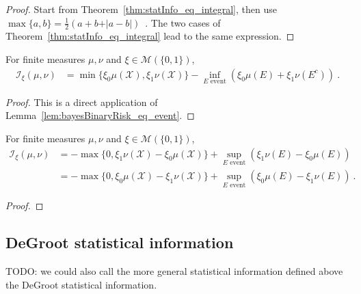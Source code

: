 \begin{proof}\leanok
{}
Start from Theorem~\ref{thm:statInfo_eq_integral}, then use $\max\{a,b\} = \frac{1}{2}\left( a + b + \vert a - b \vert \right)$~.
The two cases of Theorem~\ref{thm:statInfo_eq_integral} lead to the same expression.
\end{proof}


\begin{lemma}
  \label{lem:statInfo_eq_sub_inf_event}
  For finite measures $\mu, \nu$ and $\xi \in \mathcal M(\{0,1\})$,
  \begin{align*}
  \mathcal I_\xi(\mu, \nu)
  &= \min\{\xi_0 \mu(\mathcal X), \xi_1 \nu(\mathcal X)\} - \inf_{E \text{ event}} \left( \xi_0 \mu(E) + \xi_1 \nu(E^c) \right)
  \: .
  \end{align*}
\end{lemma}

\begin{proof}%
{}
This is a direct application of Lemma~\ref{lem:bayesBinaryRisk_eq_event}.
\end{proof}


\begin{lemma}
  \label{lem:statInfo_eq_sup_event}
  For finite measures $\mu, \nu$ and $\xi \in \mathcal M(\{0,1\})$,
  \begin{align*}
  \mathcal I_\xi(\mu, \nu)
  &= - \max\{0, \xi_1 \nu(\mathcal X) - \xi_0 \mu(\mathcal X) \} + \sup_{E \text{ event}} \left( \xi_1 \nu(E) - \xi_0 \mu(E) \right)
  \\
  &= - \max\{0, \xi_0 \mu(\mathcal X) - \xi_1 \nu(\mathcal X) \} + \sup_{E \text{ event}} \left( \xi_0 \mu(E) - \xi_1 \nu(E) \right)
  \: .
  \end{align*}
\end{lemma}

\begin{proof}%
{}

\end{proof}



\subsection{DeGroot statistical information}

TODO: we could also call the more general statistical information defined above the DeGroot statistical information.

